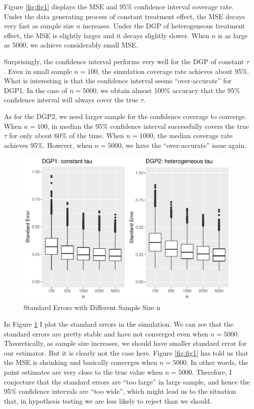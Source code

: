 \documentclass[]{article}
\begin{document}
Figure \ref{fig:fig1} displays the MSE and 95\% confidence interval
coverage rate. Under the data generating process of constant treatment
effect, the MSE decays very fast as sample size \(n\) increases. Under
the DGP of heterogeneous treatment effect, the MSE is slightly larger
and it decays slightly slower. When \(n\) is as large as 5000, we
achieve considerably small MSE.

Surprisingly, the confidence interval performs very well for the DGP of
constant \(\tau\). Even in small sample \(n=100\), the simulation
coverage rate achieves about 95\%. What is interesting is that the
confidence interval seems ``over-accurate'' for DGP1. In the case of
\(n=5000\), we obtain almost 100\% accuracy that the 95\% confidence
interval will always cover the true \(\tau\).

As for the DGP2, we need larger sample for the confidence coverage to
converge. When \(n=100\), in median the 95\% confidence interval
successfully covers the true \(\tau\) for only about 60\% of the time.
When \(n=1000\), the median coverage rate achieves 95\%. However, when
\(n=5000\), we have the ``over-accurate'' issue again.

\begin{figure}[h!]
\includegraphics{report_files/figure-latex/fig2-1} \caption{\label{fig:fig2}Standard Errors with Different Sample Size n}\label{fig:fig2}
\end{figure}

In Figure \ref{fig:fig2} I plot the standard errors in the simulation.
We can see that the standard errors are pretty stable and have not
converged even when \(n=5000\). Theoretically, as sample size increases,
we should have smaller standard error for our estimator. But it is
clearly not the case here. Figure \ref{fig:fig1} has told us that the
MSE is shrinking and basically converges when \(n=5000\). In other
words, the point estimates are very close to the true value when
\(n=5000\). Therefore, I conjecture that the standard errors are ``too
large'' in large sample, and hence the 95\% confidence intervals are
``too wide'', which might lead us to the situation that, in hypothesis
testing we are less likely to reject than we should.
\end{document}
